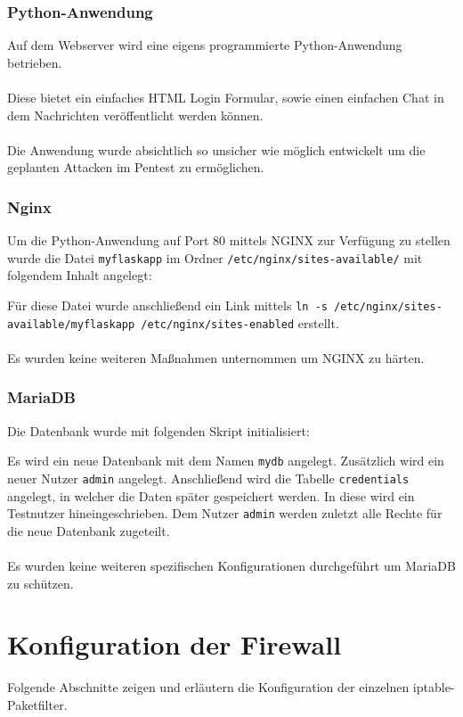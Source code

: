 \documentclass[
    a4paper,
    pagesize,
	pdftex,
    12pt,
]{scrartcl}
\begin{document}
\subsubsection{Python-Anwendung}
Auf dem Webserver wird eine eigens programmierte Python-Anwendung betrieben. \\ \\
Diese bietet ein einfaches HTML Login Formular, sowie einen einfachen Chat in dem Nachrichten veröffentlicht werden können. \\ \\
Die Anwendung wurde absichtlich so unsicher wie möglich entwickelt um die geplanten Attacken im Pentest zu  ermöglichen.

\subsubsection{Nginx}
Um die Python-Anwendung auf Port 80 mittels NGINX zur  Verfügung zu stellen wurde die Datei \lstinline[breaklines]|myflaskapp| im Ordner \lstinline[breaklines]|/etc/nginx/sites-available/| mit folgendem Inhalt angelegt:

Für diese Datei wurde anschließend ein Link mittels 
\lstinline[breaklines]|ln -s /etc/nginx/sites-available/myflaskapp /etc/nginx/sites-enabled| erstellt. \\ \\
Es wurden keine weiteren Maßnahmen unternommen um NGINX zu härten.

\subsubsection{MariaDB}
Die Datenbank wurde mit folgenden Skript initialisiert:

Es wird ein neue Datenbank mit dem Namen \lstinline[breaklines]|mydb| angelegt. Zusätzlich wird ein neuer Nutzer \lstinline[breaklines]|admin| angelegt. Anschließend wird die Tabelle \lstinline[breaklines]|credentials| angelegt, in welcher die Daten später gespeichert werden. In diese wird ein Testnutzer hineingeschrieben. Dem Nutzer \lstinline[breaklines]|admin| werden zuletzt alle Rechte für die neue Datenbank zugeteilt. \\ \\
Es wurden keine weiteren spezifischen Konfigurationen durchgeführt um MariaDB zu schützen.

\newpage
\section{Konfiguration der Firewall}
Folgende Abschnitte zeigen und erläutern die Konfiguration der einzelnen iptable-Paketfilter.
\end{document}
